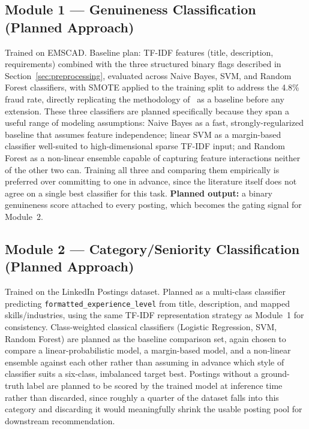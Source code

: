 \documentclass[11pt,a4paper]{article}
\begin{document}
\subsection{Module 1 --- Genuineness Classification (Planned Approach)}
\label{sec:module1-design}

Trained on EMSCAD. Baseline plan: TF-IDF features (title, description, requirements)
combined with the three structured binary flags described in
Section~\ref{sec:preprocessing}, evaluated across Naive Bayes, SVM, and Random Forest
classifiers, with SMOTE applied to the training split to address the 4.8\% fraud rate,
directly replicating the methodology of~\cite{nasser2020,ijraset2021} as a baseline
before any extension. These three classifiers are planned specifically because they
span a useful range of modeling assumptions: Naive Bayes as a fast, strongly-regularized
baseline that assumes feature independence; linear SVM as a margin-based classifier
well-suited to high-dimensional sparse TF-IDF input; and Random Forest as a non-linear
ensemble capable of capturing feature interactions neither of the other two can. Training
all three and comparing them empirically is preferred over committing to one in advance,
since the literature itself does not agree on a single best classifier for this task.
\textbf{Planned output:} a binary genuineness score attached to
every posting, which becomes the gating signal for Module~2.

\subsection{Module 2 --- Category/Seniority Classification (Planned Approach)}
\label{sec:module2-design}

Trained on the LinkedIn Postings dataset. Planned as a multi-class classifier predicting
\texttt{formatted\_experience\_level} from title, description, and mapped
skills/industries, using the same TF-IDF representation strategy as Module~1 for
consistency. Class-weighted classical classifiers (Logistic Regression, SVM, Random
Forest) are planned as the baseline comparison set, again chosen to compare a
linear-probabilistic model, a margin-based model, and a non-linear ensemble against each
other rather than assuming in advance which style of classifier suits a six-class,
imbalanced target best. Postings without a ground-truth
label are planned to be scored by the trained model at inference time rather than
discarded, since roughly a quarter of the dataset falls into this category and discarding
it would meaningfully shrink the usable posting pool for downstream recommendation.
\end{document}
